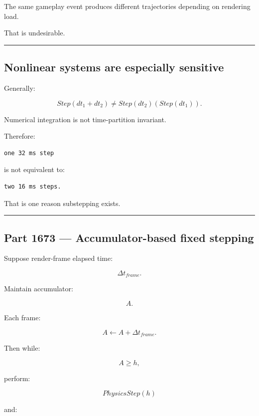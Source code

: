 The same gameplay event produces different trajectories depending on rendering load.

That is undesirable.

\begin{center}\rule{0.5\linewidth}{0.5pt}\end{center}

\subsection{Nonlinear systems are especially sensitive}\label{06-engine-ii-ch037-nonlinear-systems-are-especially-sensitive}

Generally:

\[
Step(dt_1+dt_2)
\neq
Step(dt_2)(Step(dt_1)).
\]

Numerical integration is not time-partition invariant.

Therefore:

\begin{verbatim}
one 32 ms step
\end{verbatim}

is not equivalent to:

\begin{verbatim}
two 16 ms steps.
\end{verbatim}

That is one reason substepping exists.

\begin{center}\rule{0.5\linewidth}{0.5pt}\end{center}

\subsection{Part 1673 --- Accumulator-based fixed stepping}\label{06-engine-ii-ch037-part-1673-accumulator-based-fixed-stepping}

Suppose render-frame elapsed time:

\[
\Delta t_{frame}.
\]

Maintain accumulator:

\[
A.
\]

Each frame:

\[
A\leftarrow A+\Delta t_{frame}.
\]

Then while:

\[
A\ge h,
\]

perform:

\[
PhysicsStep(h)
\]

and:


